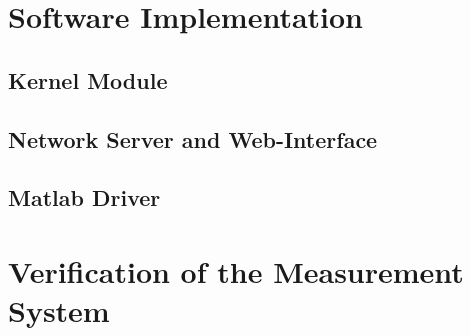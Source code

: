 \documentclass[12pt,a4paper,parskip=full,abstract=true,BCOR=10mm,twoside,open=right]{scrreprt}
\begin{document}
\chapter{Software Implementation}
\section{Kernel Module}
\section{Network Server and Web-Interface}
\section{Matlab Driver}
\chapter{Verification of the Measurement System}
\end{document}
